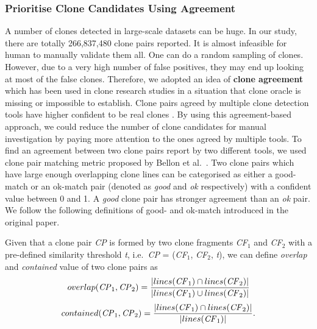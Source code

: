 \documentclass{sig-alternate-05-2015}
\newcommand{\squeezeup}{\vspace{-0.5mm}}
\begin{document}
\subsubsection{Prioritise Clone Candidates Using Agreement}
A number of clones detected in large-scale datasets can be huge. In our study, there are totally 266,837,480 clone pairs reported. It is almost infeasible for human to manually validate them all. One can do a random sampling of clones. However, due to a very high number of false positives, they may end up looking at most of the false clones. Therefore, we adopted an idea of \textbf{clone agreement} which has been used in clone research studies \cite{Wang2013,Funaro2010,cr2016ssbse} in a situation that clone oracle is missing or impossible to establish. Clone pairs agreed by multiple clone detection tools have higher confident to be real clones \cite{cr2016ssbse}. By using this agreement-based approach, we could reduce the number of clone candidates for manual investigation by paying more attention to the ones agreed by multiple tools. To find an agreement between two clone pairs report by two different tools, we used clone pair matching metric proposed by Bellon et al.~\cite{Bellon2007}. Two clone pairs which have large enough overlapping clone lines can be categorised as either a good-match or an ok-match pair (denoted as \textit{good} and \textit{ok} respectively) with a confident value between 0 and 1. A \textit{good} clone pair has stronger agreement than an \textit{ok} pair. We follow the following definitions of good- and ok-match introduced in the original paper.

\vspace{0.5ex}
Given that a clone pair \textit{CP} is formed by two clone fragments \textit{CF$_1$} and \textit{CF$_2$} with a pre-defined similarity threshold \textit{t}, i.e.~\textit{CP} = (\textit{CF$_1$}, \textit{CF$_2$}, \textit{t}), we can define \textit{overlap} and \textit{contained} value of two clone pairs as 
\begin{multline}
	overlap(\textrm{\textit{CP}}_1, \textrm{\textit{CP}}_2) = \frac{|lines(\textrm{\textit{CF}}_1) \cap lines(\textrm{\textit{CF}}_2)|}{|lines(\textrm{\textit{CF}}_1) \cup lines(\textrm{\textit{CF}}_2)|} 
\end{multline}
\begin{multline}
	contained(\textrm{\textit{CP}}_1, \textrm{\textit{CP}}_2) = \frac{|lines(\textrm{\textit{CF}}_1) \cap lines(\textrm{\textit{CF}}_2)|}{|lines(\textrm{\textit{CF}}_1)|}. 
\end{multline}
\end{document}
